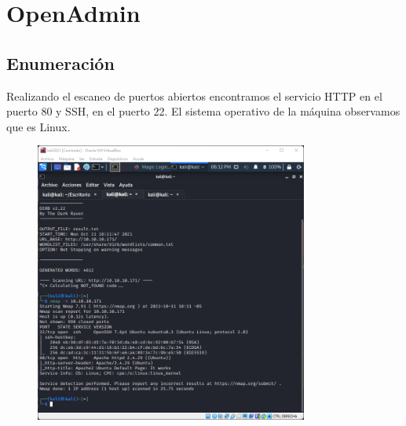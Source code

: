 \documentclass{article}
\begin{document}


\clearpage
\tableofcontents
\clearpage
\section{OpenAdmin}
\subsection{Enumeración}

Realizando el escaneo de puertos abiertos encontramos el servicio HTTP en el puerto 80 y SSH, en el puerto 22. El sistema operativo de la máquina observamos que es Linux.
\begin{figure}[h]
	\center
	\includegraphics[width=0.8\textwidth]{images/openadmin/1-escaneo.png}
	\caption{}
\end{figure}
\end{document}

